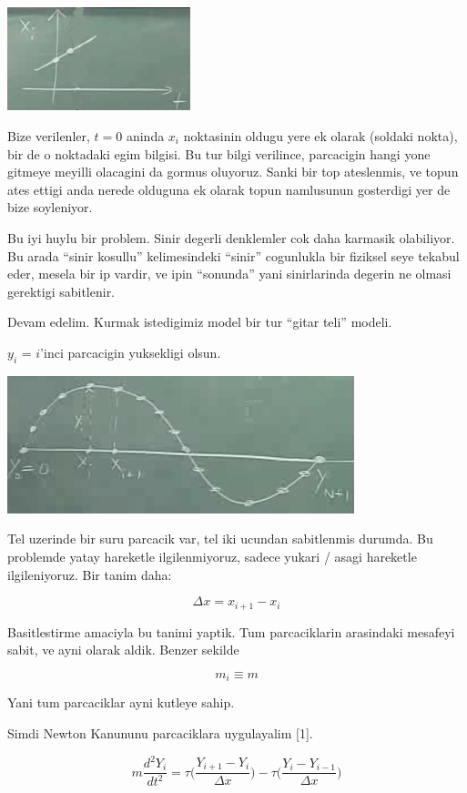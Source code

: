 \documentclass[12pt,fleqn]{article}
\begin{document}
\includegraphics[height=3cm]{1_06.png}

Bize verilenler, $t=0$ aninda $x_i$ noktasinin oldugu yere ek olarak
(soldaki nokta), bir de o noktadaki egim bilgisi. Bu tur bilgi verilince,
parcacigin hangi yone gitmeye meyilli olacagini da gormus oluyoruz. Sanki
bir top ateslenmis, ve topun ates ettigi anda nerede olduguna ek olarak
topun namlusunun gosterdigi yer de bize soyleniyor.

Bu iyi huylu bir problem. Sinir degerli denklemler cok daha karmasik
olabiliyor. Bu arada ``sinir kosullu'' kelimesindeki ``sinir'' cogunlukla
bir fiziksel seye tekabul eder, mesela bir ip vardir, ve ipin ``sonunda''
yani sinirlarinda degerin ne olmasi gerektigi sabitlenir. 

Devam edelim. Kurmak istedigimiz model bir tur ``gitar teli'' modeli. 

$y_i$ = $i$'inci parcacigin yuksekligi olsun. 

\includegraphics[height=4cm]{1_07.png}

Tel uzerinde bir suru parcacik var, tel iki ucundan sabitlenmis durumda. Bu
problemde yatay hareketle ilgilenmiyoruz, sadece yukari / asagi hareketle
ilgileniyoruz. Bir tanim daha:

\[ \Delta x = x_{i+1} - x_i  \]

Basitlestirme amaciyla bu tanimi yaptik. Tum parcaciklarin arasindaki
mesafeyi sabit, ve ayni olarak aldik. Benzer sekilde

\[ m_i \equiv m \]

Yani tum parcaciklar ayni kutleye sahip. 

Simdi Newton Kanununu parcaciklara uygulayalim [1]. 

\[ m \frac{d^2Y_i}{dt^2} = 
\tau \bigg( \frac{Y_{i+1}- Y_i}{\Delta x} \bigg) -
\tau \bigg( \frac{Y_{i}- Y_{i-1}}{\Delta x} \bigg) 
\]
\end{document}
